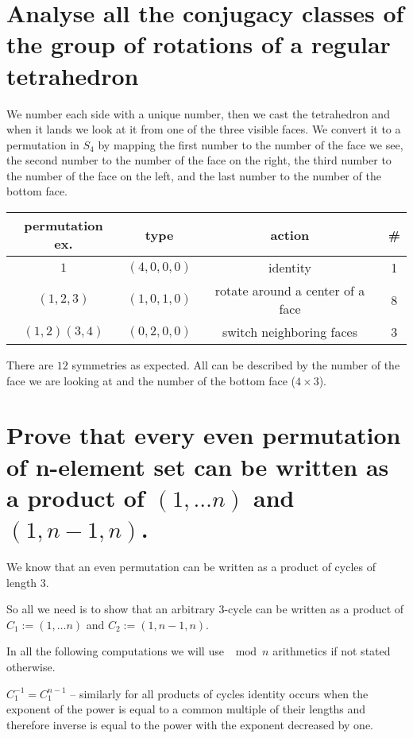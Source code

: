 \documentclass[11pt]{article}
\begin{document}
    \part*{Analyse all the conjugacy classes of the group of rotations of a regular tetrahedron}

    We number each side with a unique number, then we cast the tetrahedron and when it lands we look at it from one of the three visible faces. We convert it to a permutation in $S_4$ by mapping the first number to the number of the face we see, the second number to the number of the face on the right, the third number to the number of the face on the left, and the last number to the number of the bottom face.

    \begin{tabular}{|c|c|c|c|}
        \hline
        \textbf{permutation ex.} & \textbf{type} & \textbf{action} & \textbf{\#} \\ \hline
        $1$ & $(4, 0, 0, 0)$ & identity & 1 \\ \hline
        $(1,2,3)$ & $(1, 0, 1, 0)$ & rotate around a center of a face & 8 \\ \hline
        $(1,2)(3,4)$ & $(0, 2, 0, 0)$ & switch neighboring faces & 3 \\ \hline
    \end{tabular}

    There are $12$ symmetries as expected. All can be described by the number of the face we are looking at and the number of the bottom face ($4 \times 3$).
    \pagebreak

    \part*{Prove that every even permutation of n-element set can be written as a product of $(1,\dots n)$ and $(1, n-1, n)$.}

    We know that an even permutation can be written as a product of cycles of length 3.

    So all we need is to show that an arbitrary 3-cycle can be written as a product of $C_1 := (1,\dots n)$ and $C_2 := (1, n-1, n)$.

    In all the following computations we will use $\mod n$ arithmetics if not stated otherwise.

    $C_1^{-1} = C_1^{n - 1}$ -- similarly for all products of cycles identity occurs when the exponent of the power is equal to a common multiple of their lengths and therefore inverse is equal to the power with the exponent decreased by one.
\end{document}
